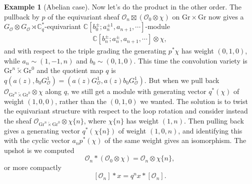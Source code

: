 \documentclass[11pt]{amsart}
\theoremstyle{definition}
\newtheorem{example}[dummy]{Example}
\newcommand{\bC}{\mathbb{C}}
\newcommand{\Gr}{\mathrm{Gr}}
\newcommand{\Oc}{\mathcal{O}}
\numberwithin{equation}{subsection}
\numberwithin{figure}{subsection}
\begin{document}
\begin{example}[Abelian case]
Now let's do the product in the other order. The pullback by $p$ of the equivariant sheaf $\Oc_{n}\boxtimes (\Oc_{0}\otimes \chi)$ on $\Gr\times \Gr$ now gives a 
$G_\Oc\otimes G_\Oc\rtimes\bC^*_q$-equivariant $\bC[b_0^\pm;a_n^{\pm1},a_{n+1},\cdots]$-module 
\begin{align}
\label{eq:big-module2}
\bC[b_n^\pm;a_n^{\pm},a_{n+1},\cdots]\otimes \chi,
\end{align}
and with respect to the triple grading the generating $p^*\chi$ has weight $(0,1,0)$, while $a_n\sim (1,-1,n)$ and $b_0\sim (0,1,0)$. This time the convolution variety is $\Gr^{n}\widetilde\times \Gr^{0} $
and the quotient map $q$ is $q(a(z),b_0G^1_\Oc) = (a(z)G^1_\Oc,a(z)b_0G^1_\Oc)$.
But when we pull back $\Oc_{\Gr^{n}\widetilde\times \Gr^{0}}\otimes \chi$ along $q$, we still get a module with generating vector $q^*(\chi)$ of weight $(1,0,0)$, rather than the $(0,1,0)$ we wanted. The solution is to twist the equivariant structure with respect to the loop rotation and consider instead the sheaf $\Oc_{\Gr^{n}\widetilde\times \Gr^{0}}\otimes \chi\{n\}$, where $\chi\{n\}$ has weight $(1,n)$. Then pulling back gives a generating vector $q^*(\chi\{n\})$ of weight  $(1,0,n)$, and identifying this with the cyclic vector $a_np^*(\chi)$ of the same weight gives an isomorphism. The upshot is we computed
$$
\Oc_n * (\Oc_{0}\otimes \chi) = \Oc_n\otimes\chi\{n\},
$$
or more compactly
$$
[\Oc_n]*x =  q^n x*[\Oc_n].
$$
\end{example}
\end{document}
